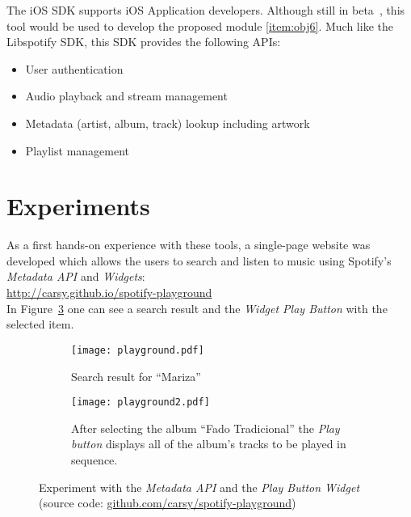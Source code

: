       The iOS SDK supports iOS Application developers. Although still in beta~\cite{iossdk}, this tool would be used to develop the proposed module \ref{item:obj6}.
      Much like the Libspotify SDK, this SDK provides the following APIs:

      \begin{itemize}
        \item User authentication
        \item Audio playback and stream management
        \item Metadata (artist, album, track) lookup including artwork
        \item Playlist management
      \end{itemize}



  \section{Experiments} %
  \label{sec:experiments}

    As a first hands-on experience with these tools, a single-page website was developed which allows the users to search and listen to music using Spotify's \emph{Metadata API} and \emph{Widgets}: \\

    \url{http://carsy.github.io/spotify-playground} \\

    In Figure~\ref{fig:playground} one can see a search result and the \emph{Widget Play Button} with the selected item.

    \begin{figure}
      \centering

      \begin{subfigure}{0.38\textwidth}
        \texttt{[image: playground.pdf]}
        \caption{Search result for ``Mariza''}
        \label{fig:playgroun_a}
      \end{subfigure}

      \begin{subfigure}{0.38\textwidth}
        \texttt{[image: playground2.pdf]}
        \caption{After selecting the album ``Fado Tradicional'' the \emph{Play button} displays all of the album's tracks to be played in sequence.}
        \label{fig:playground_b}
      \end{subfigure}

      \caption{Experiment with the \emph{Metadata API} and the \emph{Play Button Widget} (source code: \url{github.com/carsy/spotify-playground})}
      \label{fig:playground}

    \end{figure}

